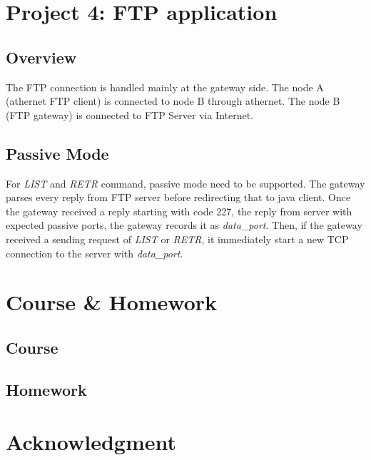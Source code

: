 \documentclass[conference,compsoc]{IEEEtran}
\begin{document}
\section{Project 4: FTP application}
	\subsection{Overview}	
	The FTP connection is handled mainly at the gateway side. The node A (athernet FTP client) is connected to node B through athernet. The node B (FTP gateway) is connected to FTP Server via Internet.
	\subsection{Passive Mode}
	For \emph{LIST} and \emph{RETR} command, passive mode need to be supported. The gateway parses every reply from FTP server before redirecting that to java client. Once the gateway received a reply starting with code 227, the reply from server with expected passive ports, the gateway records it as \emph{data\_port}. Then, if the gateway received a sending request of \emph{LIST} or \emph{RETR}, it immediately start a new TCP connection to the server with \emph{data\_port}.

\section{Course \& Homework}
	
	\subsection{Course}
	
	\subsection{Homework}

\section*{Acknowledgment}





\end{document}
